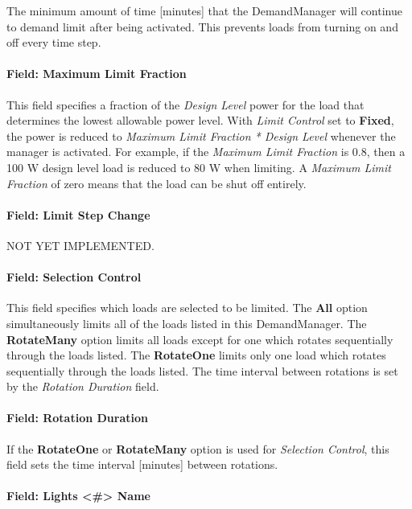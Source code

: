 The minimum amount of time {[}minutes{]} that the DemandManager will continue to demand limit after being activated. This prevents loads from turning on and off every time step.

\paragraph{Field: Maximum Limit Fraction}\label{field-maximum-limit-fraction-1}

This field specifies a fraction of the \emph{Design Level} power for the load that determines the lowest allowable power level. With \emph{Limit Control} set to \textbf{Fixed}, the power is reduced to \emph{Maximum Limit Fraction * Design Level} whenever the manager is activated. For example, if the \emph{Maximum Limit Fraction} is 0.8, then a 100 W design level load is reduced to 80 W when limiting. A \emph{Maximum Limit Fraction} of zero means that the load can be shut off entirely.

\paragraph{Field: Limit Step Change}\label{field-limit-step-change-1}

NOT YET IMPLEMENTED.

\paragraph{Field: Selection Control}\label{field-selection-control-1}

This field specifies which loads are selected to be limited. The \textbf{All} option simultaneously limits all of the loads listed in this DemandManager. The \textbf{RotateMany} option limits all loads except for one which rotates sequentially through the loads listed. The \textbf{RotateOne} limits only one load which rotates sequentially through the loads listed. The time interval between rotations is set by the \emph{Rotation Duration} field.

\paragraph{Field: Rotation Duration}\label{field-rotation-duration-1}

If the \textbf{RotateOne} or \textbf{RotateMany} option is used for \emph{Selection Control}, this field sets the time interval {[}minutes{]} between rotations.

\paragraph{Field: Lights \textless{}\#\textgreater{} Name}\label{field-lights-1-10-name}


